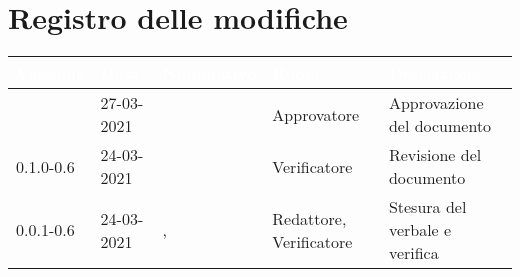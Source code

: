 \section*{Registro delle modifiche}
{
\setcounter{table}{-1}
{
\renewcommand{\arraystretch}{1.5}
\centering
\begin{longtable}{C{1.7cm} | C{2.5cm} | C{3.2cm} | C{2.7cm} | C{4.8cm}}
\textcolor{white}{\textbf{Versione}}&
\textcolor{white}{\textbf{Data}}&
\textcolor{white}{\textbf{Nominativo}}&
\textcolor{white}{\textbf{Ruolo}}&
\textcolor{white}{\textbf{Descrizione}}\\	
\endhead

\Versionedoc{} & 27-03-2021 & \Approvatore{} & Approvatore & Approvazione del documento\\	
0.1.0-0.6 & 24-03-2021 & \SH{} & Verificatore & Revisione del documento\\		
0.0.1-0.6 & 24-03-2021 & \Redattori{}, \Verificatori{} & Redattore, Verificatore & Stesura del verbale e verifica\\
		
\end{longtable}
}
}

